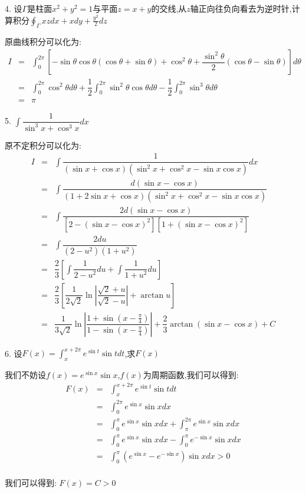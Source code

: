 4. 设$\varGamma$是柱面$x^2+y^2=1$与平面$z=x+y$的交线,从$z$轴正向往负向看去为逆时针,计算积分$\oint_{\varGamma}xzdx+xdy+\frac{y^2}{2}dz$
\begin{solution}

	原曲线积分可以化为:  
	\begin{eqnarray*}
		I&=&\int_{0}^{2\pi}\left[ -\sin\theta\cos\theta(\cos\theta+\sin\theta)+\cos^2\theta+\dfrac{\sin^2 \theta}{2}(\cos\theta-\sin\theta)\right]d\theta\\
		&=&\int_{0}^{2\pi}\cos^2\theta d\theta+\dfrac{1}{2}\int_{0}^{2\pi}\sin^2\theta\cos\theta d\theta-\dfrac{1}{2}\int_{0}^{2\pi}\sin^3\theta d\theta\\
		&=&\pi
	\end{eqnarray*}
\end{solution}

5. $\int\dfrac{1}{\sin^3 x+\cos^3 x}dx$
\begin{solution}

	原不定积分可以化为:  
	\begin{eqnarray*}
		I&=&\int \dfrac{1}{(\sin x+\cos x)(\sin^2 x+\cos^2 x-\sin x\cos x)}dx\\
		&=&\int \dfrac{d(\sin x-\cos x)}{(1+2\sin x+\cos x)(\sin^2 x+\cos^2 x-\sin x\cos x)}\\
		&=&\int \dfrac{2d(\sin x-\cos x)}{[2-(\sin x-\cos x)^2][1+(\sin x-\cos x)^2]}\\
		&=&\int \dfrac{2du}{(2-u^2)(1+u^2)}\\
		&=&\dfrac{2}{3}[\int\dfrac{1}{2-u^2}du+\int\dfrac{1}{1+u^2}du]\\
		&=&\dfrac{2}{3}[\dfrac{1}{2\sqrt{2}}\ln|\dfrac{\sqrt{2}+u}{\sqrt{2}-u}|+\arctan u]\\
		&=&\dfrac{1}{3\sqrt{2}}\ln|\dfrac{1+\sin(x-\frac{\pi}{4})}{1-\sin(x-\frac{\pi}{4})}|+\dfrac{2}{3}\arctan(\sin x-\cos x)+C
	\end{eqnarray*}
\end{solution}

6. 设$F(x)=\int_{x}^{x+2\pi}e^{\sin t}\sin tdt$,求$F(x)$
\begin{solution}

	我们不妨设$f(x)=e^{\sin x}\sin x$,$f(x)$为周期函数,我们可以得到:  
	\begin{eqnarray*}
		F(x)&=&\int_{x}^{x+2\pi}e^{\sin t}\sin tdt\\
		&=&\int_{0}^{2\pi}e^{\sin x}\sin xdx\\
		&=&\int_{0}^{\pi}e^{\sin x}\sin xdx+\int_{\pi}^{2\pi}e^{\sin x}\sin xdx\\
		&=&\int_{0}^{\pi}e^{\sin x}\sin xdx-\int_{0}^{\pi}e^{-\sin x}\sin xdx\\
		&=&\int_{0}^{\pi}(e^{\sin x}-e^{-\sin x})\sin xdx>0\\
	\end{eqnarray*}

	我们可以得到:  $F(x)=C>0$
\end{solution}


